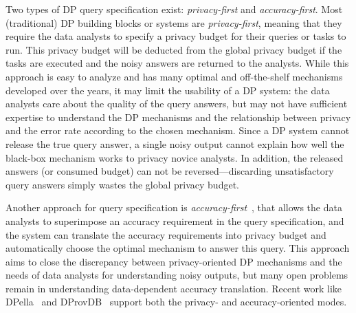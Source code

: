 Two types of DP query specification exist: \emph{privacy-first} and \emph{accuracy-first}.
Most (traditional) DP building blocks or systems are \emph{privacy-first}, meaning that they require the data analysts to specify a privacy budget for their queries or tasks to run.
This privacy budget will be deducted from the global privacy budget if the tasks are executed and the noisy answers are returned to the analysts.
While this approach is easy to analyze and has many optimal and off-the-shelf mechanisms developed over the years, it may limit the usability of a DP system: the data analysts care about the quality of the query answers, but may not have sufficient expertise to understand the DP mechanisms and the relationship between privacy and the error rate according to the chosen mechanism.
Since a DP system cannot release the true query answer, a single noisy output cannot explain how well the black-box mechanism works to privacy novice analysts.
In addition, the released answers (or consumed budget) can not be reversed—discarding unsatisfactory query answers simply wastes the global privacy budget.


Another approach for query specification is \textit{accuracy-first}~\cite{ge2019apex,Ghayyur2022mide,dprovdb,WhitehouseRWR22brownian,xiao2021optimizing,ligett2017accuracy,mazmudar2022cache,pioneer}, that allows the data analysts to superimpose an accuracy requirement in the query specification, and the system can translate the accuracy requirements into privacy budget and automatically choose the optimal mechanism to answer this query.
This approach aims to close the discrepancy between privacy-oriented DP mechanisms and the needs of data analysts for understanding noisy outputs, but many open problems remain in understanding data-dependent accuracy translation.
Recent work like DPella~\cite{lobo2020programming} and DProvDB~\cite{dprovdb} support both the privacy- and accuracy-oriented modes.





